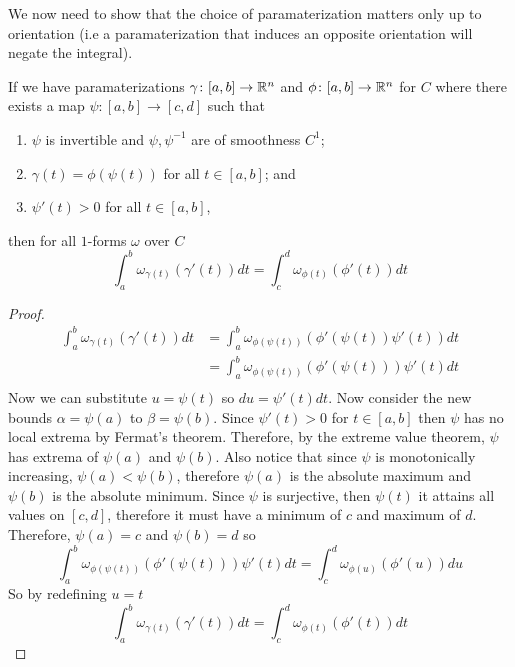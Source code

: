 \documentclass[notes]{subfiles}
\begin{document}
We now need to show that the choice of paramaterization matters only up to orientation (i.e a paramaterization that induces an opposite orientation will negate the integral).
\begin{theorem} \label{integral_uniqueness_up_to_orientation_one_form}
    If we have paramaterizations $\gamma\colon [a, b] \to \mathbb{R}^n$ and $\phi\colon [a, b] \to \mathbb{R}^n$ for $C$ where there exists a map $\psi\colon[a, b] \to [c, d]$ such that
    \begin{enumerate}[label = \arabic*)]
        \item $\psi$ is invertible and $\psi, \psi^{-1}$ are of smoothness $C^1$;
        \item $\gamma(t) = \phi(\psi(t))$ for all $t \in [a, b]$; and
        \item $\psi'(t) > 0$ for all $t \in [a, b]$,
    \end{enumerate}
    then for all $1$-forms $\omega$ over $C$
    \[
        \int_a^b \omega_{\gamma(t)}(\gamma'(t))dt = \int_c^d \omega_{\phi(t)}(\phi'(t))dt
    \]
\end{theorem}
\begin{proof}
    \begin{align*}
        \int_a^b \omega_{\gamma(t)}(\gamma'(t))dt
        &= \int_a^b \omega_{\phi(\psi(t))}(\phi'(\psi(t))\psi'(t))dt \\
        &= \int_a^b \omega_{\phi(\psi(t))}(\phi'(\psi(t)))\psi'(t)dt \\
    \end{align*}
    Now we can substitute $u = \psi(t)$ so $du = \psi'(t)dt$. Now consider the new bounds $\alpha = \psi(a)$ to $\beta = \psi(b)$. Since $\psi'(t) > 0$ for $t \in [a, b]$ then $\psi$ has no local extrema by Fermat's theorem. Therefore, by the extreme value theorem, $\psi$ has extrema of $\psi(a)$ and $\psi(b)$. Also notice that since $\psi$ is monotonically increasing, $\psi(a) < \psi(b)$, therefore $\psi(a)$ is the absolute maximum and $\psi(b)$ is the absolute minimum. Since $\psi$ is surjective, then $\psi(t)$ it attains all values on $[c, d]$, therefore it must have a minimum of $c$ and maximum of $d$. Therefore, $\psi(a) = c$ and $\psi(b) = d$ so
    \[
        \int_a^b \omega_{\phi(\psi(t))}(\phi'(\psi(t)))\psi'(t)dt
        = \int_c^d \omega_{\phi(u)}(\phi'(u))du
    \]
    So by redefining $u = t$
    \[
        \int_a^b \omega_{\gamma(t)}(\gamma'(t))dt = \int_c^d \omega_{\phi(t)}(\phi'(t))dt
    \]
\end{proof}
\end{document}
